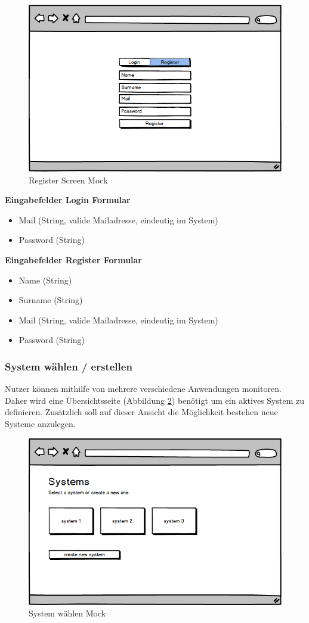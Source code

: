 \begin{figure}[h]
 \centering
 \includegraphics[width=0.7\linewidth]{kapitel1/mocks/Register.png}
 \caption{Register Screen Mock}
  \label{fig:register}
\end{figure}


\textbf{Eingabefelder Login Formular}
\begin{itemize}
\item Mail (String, valide Mailadresse, eindeutig im System)
\item Password (String)
\end{itemize}

\textbf{Eingabefelder Register Formular}
\begin{itemize}
\item Name (String)
\item Surname (String)
\item Mail (String, valide Mailadresse, eindeutig im System)
\item Password (String)
\end{itemize}



\subsubsection{System wählen / erstellen}

Nutzer können mithilfe von \projectname{} mehrere verschiedene Anwendungen monitoren.
Daher wird eine Übersichtsseite (Abbildung \ref{fig:system-picker}) benötigt
um ein aktives System zu definieren. Zusätzlich soll auf dieser Ansicht die Möglichkeit bestehen neue Systeme anzulegen.

\vspace{0.3cm}

\begin{figure}[h]
 \centering
 \includegraphics[width=0.6\linewidth]{kapitel1/mocks/system-picker.png}
 \caption{System wählen Mock}
 \label{fig:system-picker}
\end{figure}

